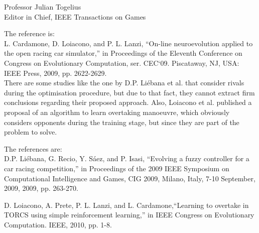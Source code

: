 \documentclass[10pt]{letter} %
\begin{document}
\begin{letter}{Professor Julian Togelius \\ Editor in Chief, IEEE Transactions on Games}
\begin{enumerate}
\begin{itemize}
\begin{itemize}
The reference is:\\
L. Cardamone, D. Loiacono, and P. L. Lanzi, ``On-line neuroevolution
applied to the open racing car simulator,'' in Proceedings of the Eleventh
Conference on Congress on Evolutionary Computation, ser. CEC`09.
Piscataway, NJ, USA: IEEE Press, 2009, pp. 2622-2629.\\
		
There are some studies like the one by D.P. Li\'ebana et al. that consider rivals during the optimisation procedure, but due to that fact, they cannot extract firm conclusions regarding their proposed approach.
Also, Loiacono et al. published a proposal of an algorithm to learn overtaking manoeuvre, which obviously considers opponents during the training stage, but since they are part of the problem to solve.

The references are:\\
D.P. Li\'ebana, G. Recio, Y. S\'aez, and P. Isasi, ``Evolving a fuzzy
controller for a car racing competition,'' in Proceedings of the 2009
IEEE Symposium on Computational Intelligence and Games, CIG 2009,
Milano, Italy, 7-10 September, 2009, 2009, pp. 263-270.

D. Loiacono, A. Prete, P. L. Lanzi, and L. Cardamone,``Learning to
overtake in TORCS using simple reinforcement learning,'' in IEEE
Congress on Evolutionary Computation. IEEE, 2010, pp. 1-8.


\end{itemize}
\end{itemize}
\end{enumerate}
\end{letter}
\end{document}
